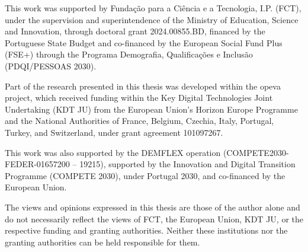 
This work was supported by Fundação para a Ciência e a Tecnologia, I.P. (FCT), under the supervision and superintendence of the Ministry of Education, Science and Innovation, through doctoral grant 2024.00855.BD, financed by the Portuguese State Budget and co-financed by the European Social Fund Plus (FSE+) through the Programa Demografia, Qualificações e Inclusão (PDQI/PESSOAS 2030).

Part of the research presented in this thesis was developed within the \acrfull{opeva} project, which received funding within the Key Digital Technologies Joint Undertaking (KDT JU) from the European Union's Horizon Europe Programme and the National Authorities of France, Belgium, Czechia, Italy, Portugal, Turkey, and Switzerland, under grant agreement 101097267.

This work was also supported by the DEMFLEX operation (COMPETE2030-FEDER-01657200 -- 19215), supported by the Innovation and Digital Transition Programme (COMPETE 2030), under Portugal 2030, and co-financed by the European Union.

The views and opinions expressed in this thesis are those of the author alone and do not necessarily reflect the views of FCT, the European Union, KDT JU, or the respective funding and granting authorities. Neither these institutions nor the granting authorities can be held responsible for them.
